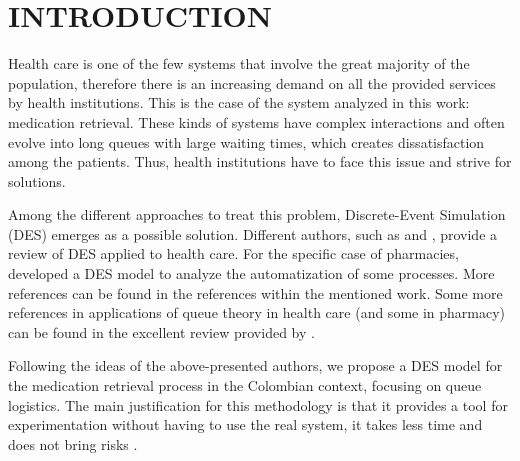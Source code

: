 \section{INTRODUCTION}
\label{sec:intro}
Health care is one of the few systems that involve the great majority of the population, therefore there is an increasing demand on all the provided services by health institutions. This is the case of the system analyzed in this work: medication retrieval. These kinds of systems have complex interactions and often evolve into long queues with large waiting times, which creates dissatisfaction among the patients. Thus, health institutions have to face this issue and strive for solutions.

Among the different approaches to treat this problem, Discrete-Event Simulation (DES) emerges as a possible solution. Different authors, such as \cite{thorwarth2009application} and \cite{jun1999application}, provide a review of DES applied to health care. For the specific case of pharmacies, \cite{reynolds2011using} developed a DES model to analyze the automatization of some processes. More references can be found in the references within the mentioned work. Some more references in applications of queue theory in health care (and some in pharmacy) can be found in the excellent review provided by \cite{lakshmi2013application}.


Following the ideas of the above-presented authors, we propose a DES model for the medication retrieval process in the Colombian context, focusing on queue logistics. The main justification for this methodology is that it provides a tool for experimentation without having to use the real system, it takes less time and does not bring risks \cite{reynolds2011using}.


